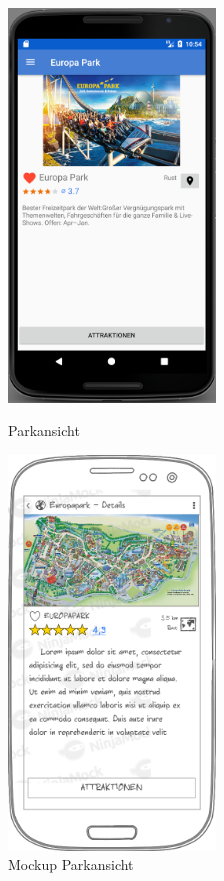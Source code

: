 \begin{figure}[h]
    \centering
    \begin{minipage}{0.49\textwidth}
        \centering
        \includegraphics[width=0.49\textwidth]{img/screenshots/ss_parkdetail.png}
        \caption{Parkansicht}
		\label{figure:implementierungparkansicht}
    \end{minipage}
    \begin{minipage}{0.49\textwidth}
        \centering
        \includegraphics[width=0.49\textwidth]{img/mockups/m_park_detail.png}
        \caption{Mockup Parkansicht}
    \end{minipage}
\end{figure}

